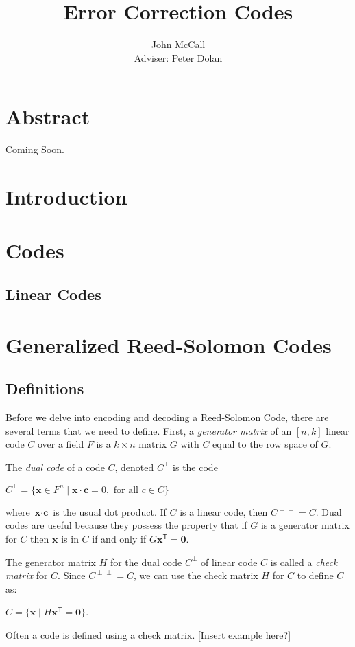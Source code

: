 \documentclass{article}
\title{Error Correction Codes}
\author{John McCall\\Adviser: Peter Dolan}
\begin{document}

\maketitle

\section{Abstract}
Coming Soon.

\section{Introduction}

\section{Codes}

\subsection{Linear Codes}

\section{Generalized Reed-Solomon Codes}

\subsection{Definitions}
Before we delve into encoding and decoding a Reed-Solomon Code, there are several terms that we need to define. First, a \textit{generator matrix} of an $[n,k]$ linear code $C$ over a field $F$ is a $k \times n$ matrix $G$ with $C$ equal to the row space of $G$. 

The \textit{dual code} of a code $C$, denoted $C^{\perp}$ is the code
\begin{center}
$C^{\perp} = \{\textbf{x} \in F^{n} \mid \textbf{x} \cdot \textbf{c} = 0, \text{ for all } c \in C\}$
\end{center}
where $\textbf{x} \cdot \textbf{c}$ is the usual dot product. If $C$ is a linear code, then $C^{\perp \perp} = C$. Dual codes are useful because they possess the property that if $G$ is a generator matrix for $C$ then $\textbf{x}$ is in $C$ if and only if $G\textbf{x}^{\mathsf{T}} = \textbf{0}$.

The generator matrix $H$ for the dual code $C^{\perp}$ of linear code $C$ is called a \textit{check matrix} for $C$. Since $C^{\perp \perp} = C$, we can use the check matrix $H$ for $C$ to define $C$ as:
\begin{center}
$C = \{\textbf{x} \mid H\textbf{x}^{\mathsf{T}} = \textbf{0}\}$.
\end{center}
Often a code is defined using a check matrix. [Insert example here?]
\end{document}
